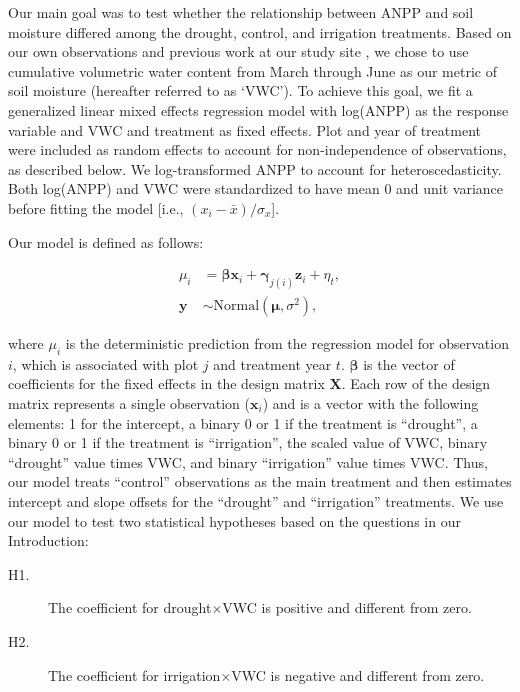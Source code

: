 \documentclass[fleqn,10pt,lineno]{wlpeerj} %
\begin{document}
Our main goal was to test whether the relationship between ANPP and soil
moisture differed among the drought, control, and irrigation treatments.
Based on our own observations and previous work at our study site
\citep{Blaisdell1958, Dalgleish2011, Adler2012}, we chose to use
cumulative volumetric water content from March through June as our
metric of soil moisture (hereafter referred to as `VWC'). To achieve
this goal, we fit a generalized linear mixed effects regression model
with log(ANPP) as the response variable and VWC and treatment as fixed
effects. Plot and year of treatment were included as random effects to
account for non-independence of observations, as described below. We
log-transformed ANPP to account for heteroscedasticity. Both log(ANPP)
and VWC were standardized to have mean 0 and unit variance before
fitting the model {[}i.e., \((x_i - \bar{x})/\sigma_x\){]}.

Our model is defined as follows:

\vspace{-2em}

\begin{align}
\mu_{i} &= \boldsymbol{\beta}\textbf{x}_i + \boldsymbol{\gamma}_{j(i)}\textbf{z}_i + \eta_t, \\
\textbf{y} &\sim \text{Normal} \left(\boldsymbol{\mu}, \sigma^2 \right),
\end{align}

\noindent{}where \(\mu_{i}\) is the deterministic prediction from the
regression model for observation \(i\), which is associated with plot
\(j\) and treatment year \(t\). \(\boldsymbol{\beta}\) is the vector of
coefficients for the fixed effects in the design matrix \(\textbf{X}\).
Each row of the design matrix represents a single observation
(\(\textbf{x}_i\)) and is a vector with the following elements: 1 for
the intercept, a binary 0 or 1 if the treatment is ``drought'', a binary
0 or 1 if the treatment is ``irrigation'', the scaled value of VWC,
binary ``drought'' value times VWC, and binary ``irrigation'' value
times VWC. Thus, our model treats ``control'' observations as the main
treatment and then estimates intercept and slope offsets for the
``drought'' and ``irrigation'' treatments. We use our model to test two
statistical hypotheses based on the questions in our Introduction:

\begin{description}
\item [H1.] The coefficient for drought$\times$VWC is positive and different from zero.
\item [H2.] The coefficient for irrigation$\times$VWC is negative and different from zero.
\end{description}
\end{document}
